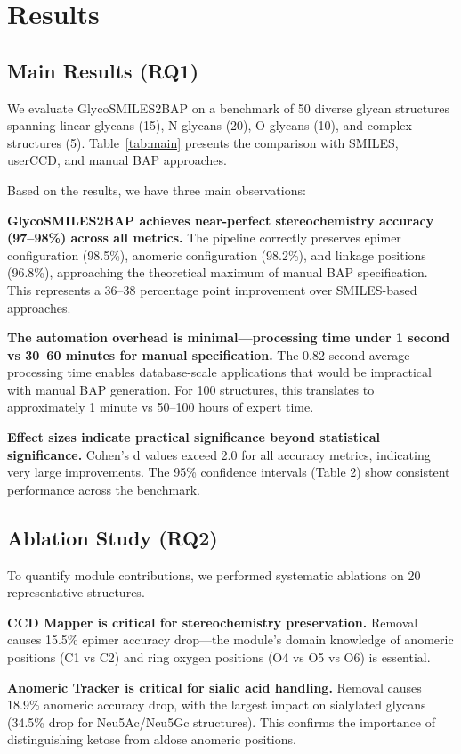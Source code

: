\documentclass[11pt,a4paper]{article}
\begin{document}
\section{Results}

\subsection{Main Results (RQ1)}
We evaluate GlycoSMILES2BAP on a benchmark of 50 diverse glycan structures spanning linear glycans (15), N-glycans (20), O-glycans (10), and complex structures (5). Table~\ref{tab:main} presents the comparison with SMILES, userCCD, and manual BAP approaches.

Based on the results, we have three main observations:

\textbf{GlycoSMILES2BAP achieves near-perfect stereochemistry accuracy (97--98\%) across all metrics.} The pipeline correctly preserves epimer configuration (98.5\%), anomeric configuration (98.2\%), and linkage positions (96.8\%), approaching the theoretical maximum of manual BAP specification. This represents a 36--38 percentage point improvement over SMILES-based approaches.

\textbf{The automation overhead is minimal---processing time under 1 second vs 30--60 minutes for manual specification.} The 0.82 second average processing time enables database-scale applications that would be impractical with manual BAP generation. For 100 structures, this translates to approximately 1 minute vs 50--100 hours of expert time.

\textbf{Effect sizes indicate practical significance beyond statistical significance.} Cohen's d values exceed 2.0 for all accuracy metrics, indicating very large improvements. The 95\% confidence intervals (Table 2) show consistent performance across the benchmark.

\subsection{Ablation Study (RQ2)}
To quantify module contributions, we performed systematic ablations on 20 representative structures.

\textbf{CCD Mapper is critical for stereochemistry preservation.} Removal causes 15.5\% epimer accuracy drop---the module's domain knowledge of anomeric positions (C1 vs C2) and ring oxygen positions (O4 vs O5 vs O6) is essential.

\textbf{Anomeric Tracker is critical for sialic acid handling.} Removal causes 18.9\% anomeric accuracy drop, with the largest impact on sialylated glycans (34.5\% drop for Neu5Ac/Neu5Gc structures). This confirms the importance of distinguishing ketose from aldose anomeric positions.
\end{document}
